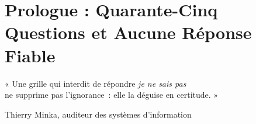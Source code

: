 
\chapter[Prologue : Quarante-Cinq Questions]{Prologue : Quarante-Cinq Questions et Aucune Réponse Fiable}
\label{chap:prologue}

\epigraph{%
    « Une grille qui interdit de répondre \emph{je ne sais pas}\\
    ne supprime pas l'ignorance~: elle la déguise en certitude. »%
}{Thierry Minka, auditeur des systèmes d'information}


